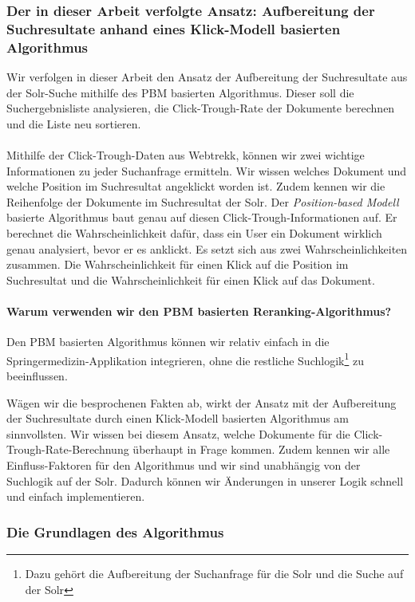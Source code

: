 \subsubsection{Der in dieser Arbeit verfolgte Ansatz: Aufbereitung der Suchresultate anhand eines Klick-Modell basierten Algorithmus}
\label{sec:Grundlagen:Grundbegriffe:Result-RerankingPBM:AnsatzSucheEinbinden}

Wir verfolgen in dieser Arbeit den Ansatz der Aufbereitung der Suchresultate aus der Solr-Suche mithilfe des PBM basierten Algorithmus. Dieser soll die Suchergebnisliste analysieren, die Click-Trough-Rate der Dokumente berechnen und die Liste neu sortieren. 
\\
\\
Mithilfe der Click-Trough-Daten aus Webtrekk, können wir zwei wichtige Informationen zu jeder Suchanfrage ermitteln. Wir wissen welches Dokument und welche Position im Suchresultat angeklickt worden ist. Zudem kennen wir die Reihenfolge der Dokumente im Suchresultat der Solr. Der \textit{Position-based Modell} basierte Algorithmus baut genau auf diesen Click-Trough-Informationen auf. Er berechnet die Wahrscheinlichkeit dafür, dass ein User ein Dokument wirklich genau analysiert, bevor er es anklickt. Es setzt sich aus zwei Wahrscheinlichkeiten zusammen. Die Wahrscheinlichkeit für einen Klick auf die Position im Suchresultat und die Wahrscheinlichkeit für einen Klick auf das Dokument. 

\paragraph{Warum verwenden wir den PBM basierten Reranking-Algorithmus?}

Den PBM basierten Algorithmus können wir relativ einfach in die Springermedizin-Applikation integrieren, ohne die restliche Suchlogik\footnote{Dazu gehört die Aufbereitung der Suchanfrage für die Solr und die Suche auf der Solr} zu beeinflussen. 

Wägen wir die besprochenen Fakten ab, wirkt der Ansatz mit der Aufbereitung der Suchresultate durch einen Klick-Modell basierten Algorithmus am sinnvollsten. Wir wissen bei diesem Ansatz, welche Dokumente für die Click-Trough-Rate-Berechnung überhaupt in Frage kommen. Zudem kennen wir alle Einfluss-Faktoren für den Algorithmus und wir sind unabhängig von der Suchlogik auf der Solr. Dadurch können wir Änderungen in unserer Logik schnell und einfach implementieren.

\subsubsection{Die Grundlagen des Algorithmus}
\label{sec:Grundlagen:Grundbegriffe:Result-RerankingPBM:Grundlagen}

